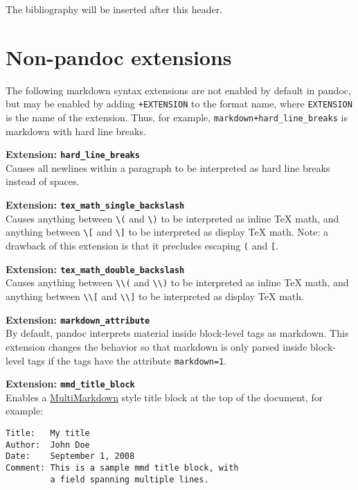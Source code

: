 \documentclass[]{article}
\begin{document}
The bibliography will be inserted after this header.

\section{Non-pandoc extensions}

The following markdown syntax extensions are not enabled by default in
pandoc, but may be enabled by adding \texttt{+EXTENSION} to the format
name, where \texttt{EXTENSION} is the name of the extension. Thus, for
example, \texttt{markdown+hard\_line\_breaks} is markdown with hard line
breaks.

\textbf{Extension: \texttt{hard\_line\_breaks}}\\Causes all newlines
within a paragraph to be interpreted as hard line breaks instead of
spaces.

\textbf{Extension: \texttt{tex\_math\_single\_backslash}}\\Causes
anything between \texttt{\textbackslash{}(} and
\texttt{\textbackslash{})} to be interpreted as inline TeX math, and
anything between \texttt{\textbackslash{}{[}} and
\texttt{\textbackslash{}{]}} to be interpreted as display TeX math.
Note: a drawback of this extension is that it precludes escaping
\texttt{(} and \texttt{{[}}.

\textbf{Extension: \texttt{tex\_math\_double\_backslash}}\\Causes
anything between \texttt{\textbackslash{}\textbackslash{}(} and
\texttt{\textbackslash{}\textbackslash{})} to be interpreted as inline
TeX math, and anything between
\texttt{\textbackslash{}\textbackslash{}{[}} and
\texttt{\textbackslash{}\textbackslash{}{]}} to be interpreted as
display TeX math.

\textbf{Extension: \texttt{markdown\_attribute}}\\By default, pandoc
interprets material inside block-level tags as markdown. This extension
changes the behavior so that markdown is only parsed inside block-level
tags if the tags have the attribute \texttt{markdown=1}.

\textbf{Extension: \texttt{mmd\_title\_block}}\\Enables a
\href{http://fletcherpenney.net/multimarkdown/}{MultiMarkdown} style
title block at the top of the document, for example:

\begin{verbatim}
Title:   My title
Author:  John Doe
Date:    September 1, 2008
Comment: This is a sample mmd title block, with
         a field spanning multiple lines.
\end{verbatim}
\end{document}
